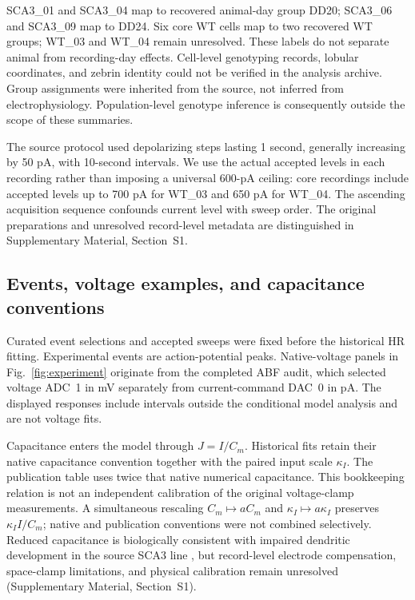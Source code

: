 \documentclass[utf8]{FrontiersinHarvard}
\newcommand{\sref}[1]{Supplementary Material, Section~#1}
\begin{document}
SCA3\_01 and SCA3\_04 map to recovered animal-day group DD20; SCA3\_06 and SCA3\_09 map to DD24. Six core WT cells map to two recovered WT groups; WT\_03 and WT\_04 remain unresolved. These labels do not separate animal from recording-day effects. Cell-level genotyping records, lobular coordinates, and zebrin identity could not be verified in the analysis archive. Group assignments were inherited from the source, not inferred from electrophysiology. Population-level genotype inference is consequently outside the scope of these summaries.

The source protocol used depolarizing steps lasting 1 second, generally increasing by 50 pA, with 10-second intervals. We use the actual accepted levels in each recording rather than imposing a universal 600-pA ceiling: core recordings include accepted levels up to 700 pA for WT\_03 and 650 pA for WT\_04. The ascending acquisition sequence confounds current level with sweep order. The original preparations and unresolved record-level metadata are distinguished in \sref{S1}.

\subsection{Events, voltage examples, and capacitance conventions}\label{sec:events}
Curated event selections and accepted sweeps were fixed before the historical HR fitting. Experimental events are action-potential peaks. Native-voltage panels in Fig.~\ref{fig:experiment} originate from the completed ABF audit, which selected voltage ADC~1 in mV separately from current-command DAC~0 in pA. The displayed responses include intervals outside the conditional model analysis and are not voltage fits.

Capacitance enters the model through $J=I/C_m$. Historical fits retain their native capacitance convention together with the paired input scale $\kappa_I$. The publication table uses twice that native numerical capacitance. This bookkeeping relation is not an independent calibration of the original voltage-clamp measurements. A simultaneous rescaling $C_m\mapsto aC_m$ and $\kappa_I\mapsto a\kappa_I$ preserves $\kappa_I I/C_m$; native and publication conventions were not combined selectively. Reduced capacitance is biologically consistent with impaired dendritic development in the source SCA3 line \citep{konno2014}, but record-level electrode compensation, space-clamp limitations, and physical calibration remain unresolved (\sref{S1}).
\end{document}
